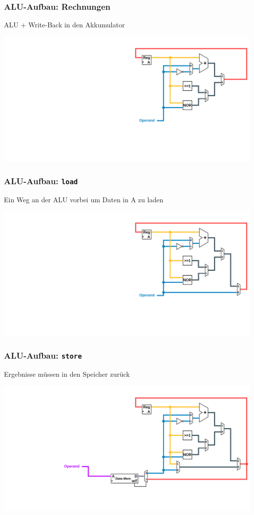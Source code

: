 \documentclass[t,aspectratio=169,usenames,dvipsnames]{beamer}
\begin{document}
\begin{frame}
  \frametitle{ALU-Aufbau: Rechnungen}

  \strut{}ALU + Write-Back in den Akkumulator

  \begin{center}
    \includegraphics[width=.85\textwidth]{sch-alu.pdf}
  \end{center}
\end{frame}

\begin{frame}
  \frametitle{ALU-Aufbau: \texttt{load}}

  \strut{}Ein Weg an der ALU vorbei um Daten in A zu laden

  \begin{center}
    \includegraphics[width=.85\textwidth]{sch-load.pdf}
  \end{center}
\end{frame}

\begin{frame}
  \frametitle{ALU-Aufbau: \texttt{store}}

  \strut{}Ergebnisse müssen in den Speicher zurück

  \begin{center}
    \includegraphics[width=.85\textwidth]{sch-loadstore.pdf}
  \end{center}
\end{frame}
\end{document}
